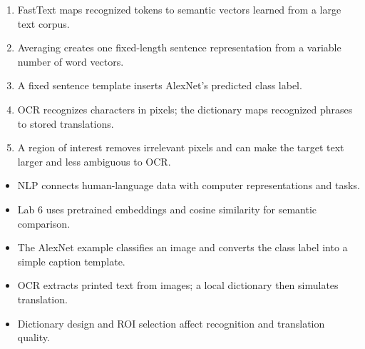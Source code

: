 \begin{checkanswers}
\begin{enumerate}
  \item FastText maps recognized tokens to semantic vectors learned from a large text corpus.
  \item Averaging creates one fixed-length sentence representation from a variable number of word vectors.
  \item A fixed sentence template inserts AlexNet's predicted class label.
  \item OCR recognizes characters in pixels; the dictionary maps recognized phrases to stored translations.
  \item A region of interest removes irrelevant pixels and can make the target text larger and less ambiguous to OCR.
\end{enumerate}
\end{checkanswers}

\begin{chapterrecap}
\begin{itemize}
  \item NLP connects human-language data with computer representations and tasks.
  \item Lab 6 uses pretrained embeddings and cosine similarity for semantic comparison.
  \item The AlexNet example classifies an image and converts the class label into a simple caption template.
  \item OCR extracts printed text from images; a local dictionary then simulates translation.
  \item Dictionary design and ROI selection affect recognition and translation quality.
\end{itemize}
\end{chapterrecap}
